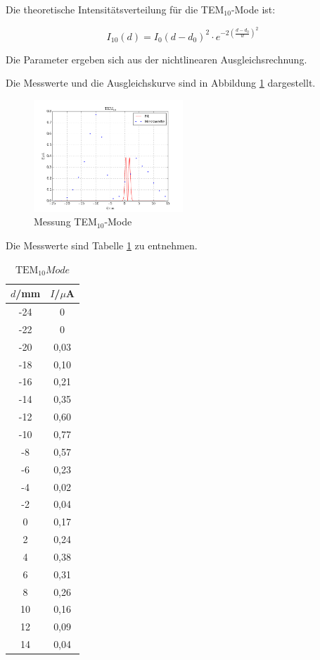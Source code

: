 \noindent Die theoretische Intensitätsverteilung für die TEM\(_{10}\)-Mode ist:

\begin{equation}
I_{10}(d)=I_0(d-d_0)^2\cdot e^{-2\left(\frac{d-d_0}{w}\right)^2}
\end{equation}

\noindent Die Parameter ergeben sich aus der nichtlinearen Ausgleichsrechnung.

\noindent Die Messwerte und die Ausgleichskurve sind in Abbildung \ref{fig:TEM10} dargestellt. 

\begin{figure}[H]
	\centering
	\includegraphics[width=0.5\textwidth]{plots/TEM10}
	\caption{Messung TEM\(_{10}\)-Mode}
	\label{fig:TEM10}
\end{figure}

\noindent Die Messwerte sind Tabelle \ref{tab:t6} zu entnehmen.

\begin{table}[H]
	\begin{center}
		\begin{tabular}{c c}
			\toprule
			\(d\)/mm & \(I\)/\(\mu\)A \\
			\midrule
			-24     &0\\
			-22     &0\\
			-20     &0,03\\
			-18     &0,10\\
			-16     &0,21\\
			-14     &0,35\\
			-12     &0,60\\
			-10     &0,77\\
			-8      &0,57\\
			-6      &0,23\\
			-4      &0,02\\
			-2      &0,04\\
			0       &0,17\\
			2       &0,24\\
			4       &0,38\\
			6       &0,31\\
			8       &0,26\\
			10     & 0,16\\
			12      &0,09\\
			14      &0,04\\
			\bottomrule
		\end{tabular}
		\caption{\(\text{TEM}_{10} Mode\)}
		\label{tab:t6}
	\end{center}
\end{table}

